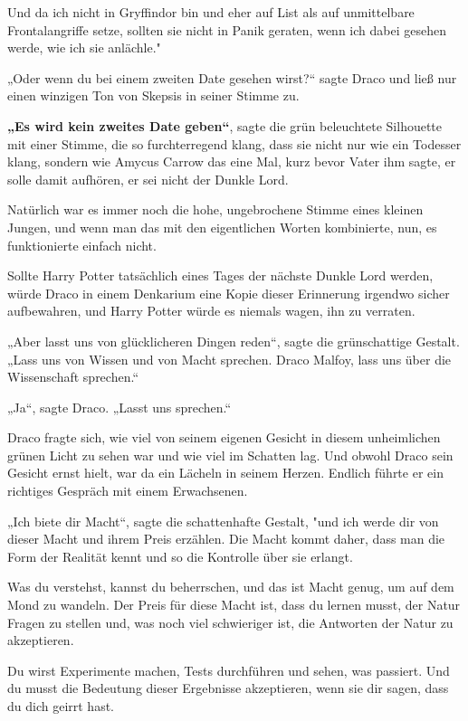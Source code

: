 {Und da ich nicht in Gryffindor bin und eher auf List als auf unmittelbare Frontalangriffe setze, sollten sie nicht in Panik geraten, wenn ich dabei gesehen werde, wie ich sie anlächle."

„Oder wenn du bei einem zweiten Date gesehen wirst?“ sagte Draco und ließ nur einen winzigen Ton von Skepsis in seiner Stimme zu.

\textbf{„Es wird kein zweites Date geben“}, sagte die grün beleuchtete Silhouette mit einer Stimme, die so furchterregend klang, dass sie nicht nur wie ein Todesser klang, sondern wie Amycus Carrow das eine Mal, kurz bevor Vater ihm sagte, er solle damit aufhören, er sei nicht der Dunkle Lord.

Natürlich war es immer noch die hohe, ungebrochene Stimme eines kleinen Jungen, und wenn man das mit den eigentlichen Worten kombinierte, nun, es funktionierte einfach nicht.

Sollte Harry Potter tatsächlich eines Tages der nächste Dunkle Lord werden, würde Draco in einem Denkarium eine Kopie dieser Erinnerung irgendwo sicher aufbewahren, und Harry Potter würde es niemals wagen, ihn zu verraten.

„Aber lasst uns von glücklicheren Dingen reden“, sagte die grünschattige Gestalt. „Lass uns von Wissen und von Macht sprechen. Draco Malfoy, lass uns über die Wissenschaft sprechen.“

„Ja“, sagte Draco. „Lasst uns sprechen.“

Draco fragte sich, wie viel von seinem eigenen Gesicht in diesem unheimlichen grünen Licht zu sehen war und wie viel im Schatten lag. Und obwohl Draco sein Gesicht ernst hielt, war da ein Lächeln in seinem Herzen. Endlich führte er ein richtiges Gespräch mit einem Erwachsenen.

„Ich biete dir Macht“, sagte die schattenhafte Gestalt, "und ich werde dir von dieser Macht und ihrem Preis erzählen. Die Macht kommt daher, dass man die Form der Realität kennt und so die Kontrolle über sie erlangt.

Was du verstehst, kannst du beherrschen, und das ist Macht genug, um auf dem Mond zu wandeln. Der Preis für diese Macht ist, dass du lernen musst, der Natur Fragen zu stellen und, was noch viel schwieriger ist, die Antworten der Natur zu akzeptieren.

Du wirst Experimente machen, Tests durchführen und sehen, was passiert. Und du musst die Bedeutung dieser Ergebnisse akzeptieren, wenn sie dir sagen, dass du dich geirrt hast.

}
